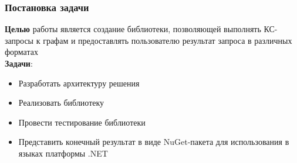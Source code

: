 \documentclass{beamer}
\begin{document}
\begin{frame}
  \transwipe[direction=90]
  \frametitle{Постановка задачи}
  \textbf{Целью} работы является создание библиотеки, позволяющей выполнять КС-запросы к графам и предоставлять пользователю результат запроса в различных форматах\\ 
  \textbf{Задачи}:
  \begin{itemize}
    \item Разработать архитектуру решения
    \item Реализовать библиотеку
    \item Провести тестирование библиотеки
    \item Представить конечный результат в виде NuGet-пакета для использования в языках платформы .NET
  \end{itemize}
\end{frame}

\end{document}
